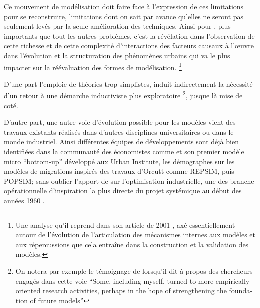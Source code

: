 Ce mouvement de modélisation doit faire face à l'expression de ces limitations pour se reconstruire, limitations dont on sait par avance qu'elles ne seront pas seulement levés par la seule amélioration des techniques. Ainsi pour \autocite[11]{Batty1976}, plus importants que tout les autres problèmes, c'est la révélation dans l'observation de cette richesse et de cette complexité d'interactions des facteurs causaux à l’œuvre dans l'évolution et la structuration des phénomènes urbains qui va le plus impacter sur la réévaluation des formes de modélisation. \footnote{Une analyse qu'il reprend dans son article de 2001 \autocite{Batty2001}, axé essentiellement autour de l'évolution de l'articulation des mécanismes internes aux modèles et aux répercussions que cela entraîne dans la construction et la validation des modèles.}

D'une part l'emploie de théories trop simplistes, induit indirectement la nécessité d'un retour à une démarche inductiviste plus exploratoire \footnote{On notera par exemple le témoignage de \autocite{Boyce1988} lorsqu'il dit à propos des chercheurs engagés dans cette voie \foreignquote{english}{Some, including myself, turned to more empirically oriented research activities, perhaps in the hope of strengthening the foundation of future models}}, jusque là mise de coté. 

D'autre part, une autre voie d'évolution possible pour les modèles vient des travaux existants réalisés dans d'autres disciplines universitaires ou dans le monde industriel. Ainsi différentes équipes de développements sont déjà bien identifiées dans la communauté des économistes comme \textcite{Orcutt1960} et son premier modèle micro \foreignquote{english}{bottom-up} développé aux Urban Institute, les démographes sur les modèles de migrations inspirés des travaux d'Orcutt comme REPSIM, puis POPSIM; sans oublier l'apport de \textcite{Forrester1961} sur l'optimisation industrielle, une des branche opérationnelle d'inspiration la plus directe du projet systémique au début des années 1960 \autocite{Cohen1961} \autocite[911]{Shubik1960b}.


